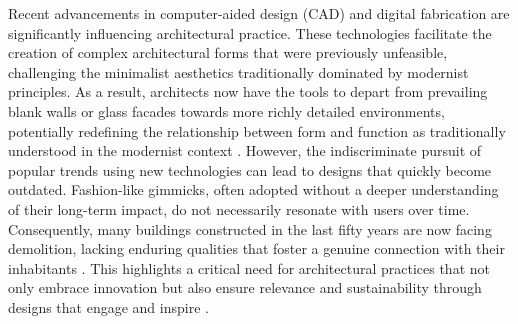 


Recent advancements in computer-aided design (CAD) and digital fabrication are significantly influencing architectural practice.
These technologies facilitate the creation of complex architectural forms that were previously unfeasible, challenging the minimalist aesthetics traditionally dominated by modernist principles.
As a result, architects now have the tools to depart from prevailing blank walls or glass facades towards more richly detailed environments, potentially redefining the relationship between form and function as traditionally understood in the modernist context \cite{Gage2015}.
However, the indiscriminate pursuit of popular trends using new technologies can lead to designs that quickly become outdated.
Fashion-like gimmicks, often adopted without a deeper understanding of their long-term impact, do not necessarily resonate with users over time.
Consequently, many buildings constructed in the last fifty years are now facing demolition, lacking enduring qualities that foster a genuine connection with their inhabitants \cite{Aesthetic2022}.
This highlights a critical need for architectural practices that not only embrace innovation but also ensure relevance and sustainability through designs that engage and inspire \cite{Brielmann2022}.

